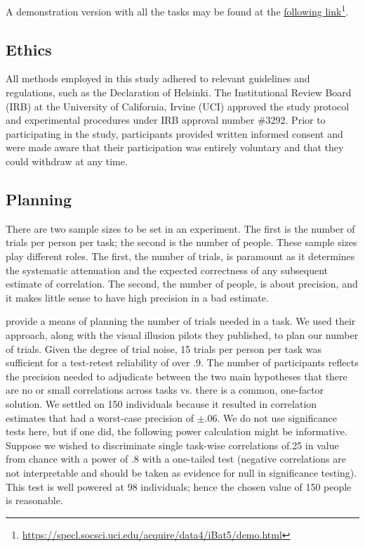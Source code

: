 A demonstration version with all the tasks may be found at the \href{https://specl.socsci.uci.edu/acquire/data4/iBat5/demo.html}{following link}\footnote{\url{https://specl.socsci.uci.edu/acquire/data4/iBat5/demo.html}}.

\subsection*{Ethics}

All methods employed in this study adhered to relevant guidelines and regulations, such as the Declaration of Helsinki. The Institutional Review Board (IRB) at the University of California, Irvine (UCI) approved the study protocol and experimental procedures under IRB approval number \#3292. Prior to participating in the study, participants provided written informed consent and were made aware that their participation was entirely voluntary and that they could withdraw at any time. 

\subsection*{Planning}

There are two sample sizes to be set in an experiment.  The first is the number of trials per person per task; the second is the number of people.  These sample sizes play different roles.  The first, the number of trials, is paramount as it determines the systematic attenuation and the expected correctness of any subsequent estimate of correlation.  The second, the number of people, is about precision, and it makes little sense to have high precision in a bad estimate.  

\textcite{Rouder.Mehrvarz.2024} provide a means of planning the number of trials needed in a task.  We used their approach, along with the visual illusion pilots they published, to plan our number of trials.  Given the degree of trial noise, 15 trials per person per task was sufficient for a test-retest reliability of over .9.  The number of participants reflects the precision needed to adjudicate between the two main hypotheses that there are no or small correlations across tasks vs. there is a common, one-factor solution.  We settled on 150 individuals because it resulted in correlation estimates that had a worst-case precision of $\pm .06$.  We do not use significance tests here, but if one did, the following power calculation might be informative.  Suppose we wished to discriminate single task-wise correlations of.25 in value from chance with a power of .8 with a one-tailed test (negative correlations are not interpretable and should be taken as evidence for null in significance testing).  This test is well powered at 98 individuals; hence the chosen value of 150 people is reasonable.


